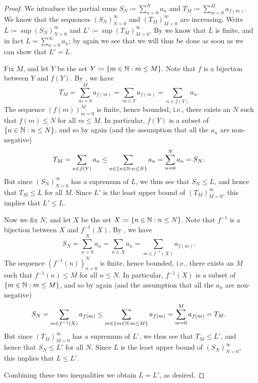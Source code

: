 \begin{proof}
  We introduce the partial sums \(S_N \coloneqq \sum_{n = 0}^N a_n\) and \(T_M \coloneqq \sum_{m = 0}^M a_{f(m)}\).
  We know that the sequences \((S_N)_{N = 0}^\infty\) and \((T_M)_{M = 0}^\infty\) are increasing.
  Write \(L \coloneqq \sup(S_N)_{N = 0}^\infty\) and \(L' \coloneqq \sup(T_M)_{M = 0}^\infty\).
  By  we know that \(L\) is finite, and in fact \(L = \sum_{n = 0}^\infty a_n\);
  by  again we see that we will thus be done as soon as we can show that \(L' = L\).

  Fix \(M\), and let \(Y\) be the set \(Y \coloneqq \left\lbrace m \in \mathbb{N} : m \leq M\right\rbrace\).
  Note that \(f\) is a bijection between \(Y\) and \(f(Y)\).
  By , we have
  \[
    T_M = \sum_{m = 0}^M a_{f(m)} = \sum_{m \in Y} a_{f(m)} = \sum_{n \in f(Y)} a_n.
  \]
  The sequence \((f(m))_{m = 0}^M\) is finite, hence bounded, i.e., there exists an \(N\) such that \(f(m) \leq N\) for all \(m \leq M\).
  In particular, \(f(Y)\) is a subset of \(\left\lbrace n \in \mathbb{N} : n \leq N\right\rbrace\), and so by  again (and the assumption that all the \(a_n\) are non-negative)
  \[
    T_M = \sum_{n \in f(Y)} a_n \leq \sum_{n \in \left\lbrace n \in \mathbb{N} : n \leq N\right\rbrace} a_n = \sum_{n = 0}^N a_n = S_N.
  \]
  But since \((S_N)_{N = 0}^\infty\) has a supremum of \(L\), we thus see that \(S_N \leq L\), and hence that \(T_M \leq L\) for all \(M\).
  Since \(L'\) is the least upper bound of \((T_M)_{M = 0}^\infty\), this implies that \(L' \leq L\).

  Now we fix \(N\), and let \(X\) be the set \(X \coloneqq \left\lbrace n \in \mathbb{N} : n \leq N\right\rbrace\).
  Note that \(f^{-1}\) is a bijection between \(X\) and \(f^{-1}(X)\).
  By , we have
  \[
    S_N = \sum_{n = 0}^N a_n = \sum_{n \in X} a_n = \sum_{m \in f^{-1}(X)} a_{f(m)}.
  \]
  The sequence \((f^{-1}(n))_{n = 0}^N\) is finite, hence bounded, i.e., there exists an \(M\) such that \(f^{-1}(n) \leq M\) for all \(n \leq N\).
  In particular, \(f^{-1}(X)\) is a subset of \(\left\lbrace m \in \mathbb{N} : m \leq M\right\rbrace\), and so by  again (and the assumption that all the \(a_n\) are non-negative)
  \[
    S_N = \sum_{m \in f^{-1}(X)} a_{f(m)} \leq \sum_{m \in \left\lbrace m \in \mathbb{N} : m \leq M\right\rbrace} a_{f(m)} = \sum_{m = 0}^M a_{f(m)} = T_M.
  \]
  But since \((T_M)_{M = 0}^\infty\) has a supremum of \(L'\), we thus see that \(T_M \leq L'\), and hence that \(S_N \leq L'\) for all \(N\).
  Since \(L\) is the least upper bound of \((S_N)_{N = 0}^\infty\), this implies that \(L \leq L'\).

  Combining these two inequalities we obtain \(L = L'\), as desired.
\end{proof}

